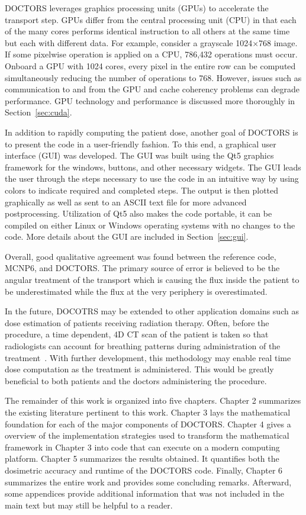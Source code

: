 DOCTORS leverages graphics processing units (GPUs) to accelerate the transport step. GPUs differ from the central processing unit (CPU) in that each of the many cores performs identical instruction to all others at the same time but each with different data. For example, consider a grayscale 1024$\times$768 image. If some pixelwise operation is applied on a CPU, 786,432 operations must occur. Onboard a GPU with 1024 cores, every pixel in the entire row can be computed simultaneously reducing the number of operations to 768. However, issues such as communication to and from the GPU and cache coherency problems can degrade performance. GPU technology and performance is discussed more thoroughly in Section~\ref{sec:cuda}.

In addition to rapidly computing the patient dose, another goal of DOCTORS is to present the code in a user-friendly fashion. To this end, a graphical user interface (GUI) was developed. The GUI was built using the Qt5 graphics framework for the windows, buttons, and other necessary widgets. The GUI leads the user through the steps necessary to use the code in an intuitive way by using colors to indicate required and completed steps. The output is then plotted graphically as well as sent to an ASCII text file for more advanced postprocessing. Utilization of Qt5 also makes the code portable, it can be compiled on either Linux or Windows operating systems with no changes to the code. More details about the GUI are included in Section~\ref{sec:gui}.

Overall, good qualitative agreement was found between the reference code, MCNP6, and DOCTORS. The primary source of error is believed to be the angular treatment of the transport which is causing the flux inside the patient to be underestimated while the flux at the very periphery is overestimated.

In the future, DOCOTRS may be extended to other application domains such as dose estimation of patients receiving radiation therapy. Often, before the procedure, a time dependent, 4D CT scan of the patient is taken so that radiologists can account for breathing patterns during administration of the treatment~\citep{ref:pant}. With further development, this methodology may enable real time dose computation as the treatment is administered. This would be greatly beneficial to both patients and the doctors administering the procedure.

The remainder of this work is organized into five chapters. Chapter 2 summarizes the existing literature pertinent to this work. Chapter 3 lays the mathematical foundation for each of the major components of DOCTORS. Chapter 4 gives a overview of the implementation strategies used to transform the mathematical framework in Chapter 3 into code that can execute on a modern computing platform. Chapter 5 summarizes the results obtained. It quantifies both the dosimetric accuracy and runtime of the DOCTORS code. Finally, Chapter 6 summarizes the entire work and provides some concluding remarks. Afterward, some appendices provide additional information that was not included in the main text but may still be helpful to a reader. 

\endinput
